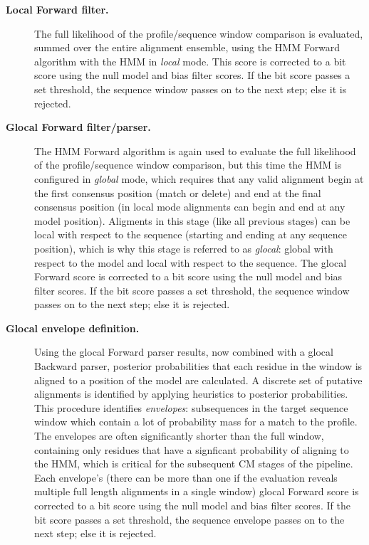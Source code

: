 \begin{description}
\begin{description}
\item[\textbf{Local Forward filter.}] The full likelihood of
  the profile/sequence window comparison is evaluated, summed over the
  entire alignment ensemble, using the HMM Forward algorithm with the
  HMM in \emph{local} mode. This score is corrected to a bit score using the
  null model and bias filter scores. If the bit score passes a set
  threshold, the sequence window passes on to the next step; else it
  is rejected.

\item[\textbf{Glocal Forward filter/parser.}]  The HMM Forward
  algorithm is again used to evaluate the full likelihood of the
  profile/sequence window comparison, but this time the HMM is
  configured in \emph{global} mode, which requires that any valid
  alignment begin at the first consensus position (match or delete)
  and end at the final consensus position (in local mode alignments
  can begin and end at any model position). Aligments in this stage
  (like all previous stages) can be local with respect to the sequence
  (starting and ending at any sequence position), which is why this
  stage is referred to as \emph{glocal}: global with respect to the
  model and local with respect to the sequence. The glocal Forward
  score is corrected to a bit score using the null model and bias
  filter scores. If the bit score passes a set threshold, the sequence
  window passes on to the next step; else it is rejected.
  
\item[\textbf{Glocal envelope definition.}] Using the glocal Forward
  parser results, now combined with a glocal Backward parser,
  posterior probabilities that each residue in the window is aligned
  to a position of the model are calculated. A discrete set of
  putative alignments is identified by applying heuristics to
  posterior probabilities. This procedure identifies \emph{envelopes}:
  subsequences in the target sequence window which contain a lot of
  probability mass for a match to the profile. The envelopes are often
  significantly shorter than the full window, containing only residues
  that have a signficant probability of aligning to the HMM, which is
  critical for the subsequent CM stages of the pipeline. Each
  envelope's (there can be more than one if the evaluation reveals
  multiple full length alignments in a single window) glocal Forward
  score is corrected to a bit score using the null model and bias
  filter scores. If the bit score passes a set threshold, the sequence
  envelope passes on to the next step; else it is rejected.


\end{description}
\end{description}
